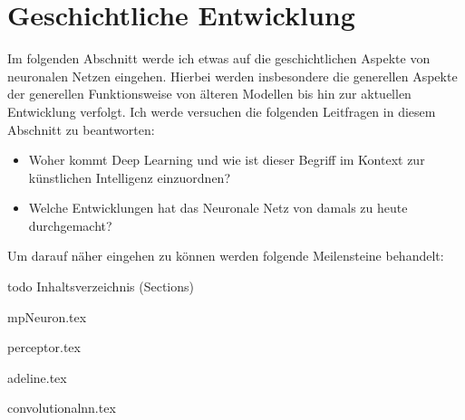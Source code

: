 \part{Geschichtliche Entwicklung}

Im folgenden Abschnitt werde ich etwas auf die geschichtlichen Aspekte von neuronalen Netzen eingehen. Hierbei werden insbesondere die generellen Aspekte der generellen Funktionsweise von älteren Modellen bis hin zur aktuellen Entwicklung verfolgt. Ich werde versuchen die folgenden Leitfragen in diesem Abschnitt zu beantworten: 

\begin{itemize}
\item Woher kommt Deep Learning und wie ist dieser Begriff im Kontext zur künstlichen Intelligenz einzuordnen?
\item Welche Entwicklungen hat das Neuronale Netz von damals zu heute durchgemacht?
\end{itemize}

Um darauf näher eingehen zu können werden folgende Meilensteine behandelt: 

todo Inhaltsverzeichnis (Sections)

{mpNeuron.tex}
\FloatBarrier
\pagebreak

{perceptor.tex}
\FloatBarrier
\pagebreak

{adeline.tex}
\FloatBarrier
\pagebreak

{convolutionalnn.tex}
